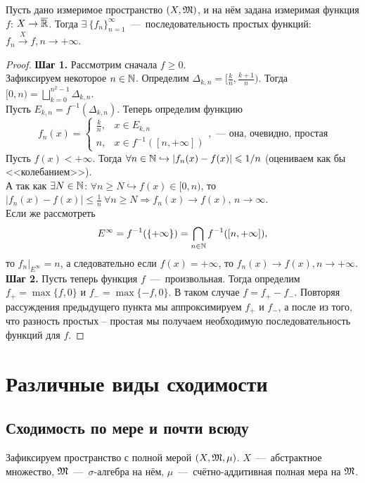 \begin{theorem}
    Пусть дано измеримое пространство $(X, \mathfrak{M})$, и на нём задана измеримая функция $f$: $X \rightarrow \overline{\mathbb{R}}$. Тогда $\exists \ \{f_n\}_{n = 1}^\infty$~---~последовательность простых функций: $f_n \xrightarrow{X} f, n \rightarrow +\infty$.
\end{theorem}
\begin{proof}
\textbf{Шаг 1.} Рассмотрим сначала $f \geq 0$. \\
    Зафиксируем некоторое $n \in \mathbb{N}$. Определим $\Delta_{k, n} = [\frac{k}{n}, \frac{k + 1}{n})$. Тогда $[0, n) = \bigsqcup\limits_{k = 0}^{n^2 - 1} \Delta_{k, n}$. \\
    Пусть $E_{k, n} = f^{-1}(\Delta_{k, n})$. Теперь определим функцию 
    \[
    f_n(x) = 
    \begin{cases}
        \frac{k}{n}, &  x \in E_{k, n} \\
         n, &  x \in f^{-1}([n, +\infty])
    \end{cases},\text{~---~она, очевидно, простая}
    \]
    Пусть $f(x) < +\infty$. Тогда $\forall n \in \mathbb{N} \hookrightarrow | f_n(x) - f(x) | \leqslant 1 / n$ (оцениваем как бы <<колебанием>>).\\
    А так как $\exists N \in \mathbb{N}$: $\forall n \geq N \hookrightarrow f(x) \in [0, n)$, то $ |f_n(x) - f(x)| \leq \frac{1}{n}\  \forall n \geq N \Rightarrow f_n(x) \xrightarrow{} f(x)$, $n \to \infty$.\\
    Если же рассмотреть \[E^\infty = f^{-1}(\{+\infty\}) = \bigcap\limits_{n \in \mathbb{N}} f^{-1}([n, +\infty]),\]
    то $f_n|_{E^\infty} = n$, а следовательно если $f(x) = +\infty$, то $f_n(x) \rightarrow f(x), n \rightarrow +\infty$. \\
    \textbf{Шаг 2.} Пусть теперь функция $f$~---~произвольная. Тогда определим $f_+ = \max\{f, 0\}$ и $f_- = \max\{-f, 0\}$. В таком случае $f = f_+ - f_-$. Повторяя рассуждения предыдущего пункта мы аппроксимируем $f_+$ и $f_-$, а после из того, что разность простых -- простая мы получаем необходимую последовательность функций для $f$.
\end{proof}

\section{Различные виды сходимости}
\subsection{Сходимость по мере и почти всюду}
Зафиксируем пространство с полной мерой $(X, \mathfrak{M}, \mu)$. $X$~---~абстрактное множество, $\mathfrak{M}$~---~$\sigma$-алгебра на нём, $\mu$~---~счётно-аддитивная полная мера на $\mathfrak{M}$.

